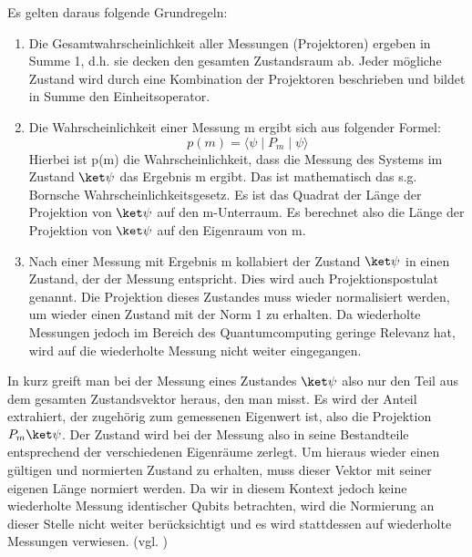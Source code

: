 Es gelten daraus folgende Grundregeln: 
\begin{enumerate}
\item Die Gesamtwahrscheinlichkeit aller Messungen (Projektoren) ergeben in Summe 1, d.h. sie decken den gesamten Zustandsraum ab. Jeder mögliche Zustand wird durch eine Kombination der Projektoren beschrieben und bildet in Summe den Einheitsoperator. \\
\item Die Wahrscheinlichkeit einer Messung m ergibt sich aus folgender Formel:
\begin{equation}
    p(m) = \langle \psi \mid P_m \mid \psi \rangle
\end{equation}
Hierbei ist p(m) die Wahrscheinlichkeit, dass die Messung des Systems im Zustand $\ket\psi$ das Ergebnis m ergibt. Das ist mathematisch das s.g. Bornsche Wahrscheinlichkeitsgesetz.
Es ist das Quadrat der Länge der Projektion von $\ket\psi$ auf den m-Unterraum. Es berechnet also die Länge der Projektion von $\ket\psi$ auf den Eigenraum von m. \\
\item Nach einer Messung mit Ergebnis m kollabiert der Zustand $\ket\psi$ in einen Zustand, der der Messung entspricht. Dies wird auch Projektionspostulat genannt. Die Projektion dieses Zustandes muss wieder normalisiert werden, um wieder einen Zustand mit der Norm 1 zu erhalten.
Da wiederholte Messungen jedoch im Bereich des Quantumcomputing geringe Relevanz hat, wird auf die wiederholte Messung nicht weiter eingegangen. \\ 
\end{enumerate}

In kurz greift man bei der Messung eines Zustandes $\ket\psi$ also nur den Teil aus dem gesamten Zustandsvektor heraus, den man misst. Es wird der Anteil extrahiert, der zugehörig zum gemessenen Eigenwert ist, also die Projektion $P_m \ket\psi$. Der Zustand wird bei der Messung also in seine Bestandteile entsprechend der verschiedenen Eigenräume zerlegt. Um hieraus wieder einen gültigen und normierten Zustand zu erhalten, muss dieser Vektor mit seiner eigenen Länge normiert werden. Da wir in diesem Kontext jedoch keine wiederholte Messung identischer Qubits betrachten, wird die Normierung an dieser Stelle nicht weiter berücksichtigt und es wird stattdessen auf wiederholte Messungen verwiesen. 
(vgl. \cite[Ch. 3.9]{kasirajan_fundamentals_2021})
\\ 

